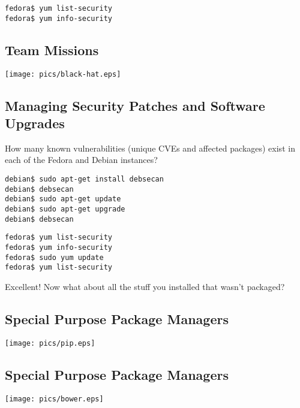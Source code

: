 \documentclass[xga]{xdvislides}
\begin{document}
\begin{verbatim}
fedora$ yum list-security
fedora$ yum info-security
\end{verbatim}

\subsection{Team Missions}

\vspace*{\fill}
\begin{center}
\texttt{[image: pics/black-hat.eps]}
\end{center}
\vspace*{\fill}


\subsection{Managing Security Patches and Software Upgrades}
How many known vulnerabilities (unique CVEs and affected packages) exist
in each of the Fedora and Debian instances?

\begin{verbatim}
debian$ sudo apt-get install debsecan
debian$ debsecan
debian$ sudo apt-get update
debian$ sudo apt-get upgrade
debian$ debsecan
\end{verbatim}

\begin{verbatim}
fedora$ yum list-security
fedora$ yum info-security
fedora$ sudo yum update
fedora$ yum list-security
\end{verbatim}

\vspace{.5in}
Excellent! Now what about all the stuff you installed that
wasn't packaged?

\subsection{Special Purpose Package Managers}
\vfill
\begin{center}
	\texttt{[image: pics/pip.eps]}
\end{center}
\vfill

\subsection{Special Purpose Package Managers}
\vfill
\begin{center}
	\texttt{[image: pics/bower.eps]}
\end{center}
\vfill
\end{document}
